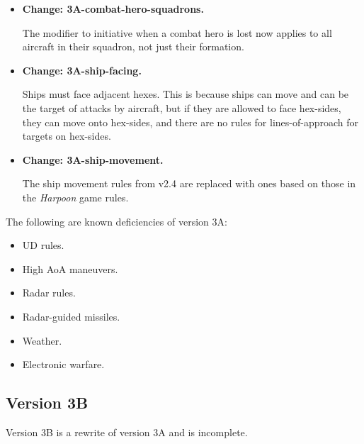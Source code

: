 \documentclass[10pt]{report}
\newcommand{\itemtag}[1]{\item \textbf{Change: #1.}\par}
\begin{document}
\begin{itemize}
    \itemtag{3A-combat-hero-squadrons} The  modifier to initiative when a combat hero is lost now applies to all aircraft in their squadron, not just their formation.
    
    \itemtag{3A-ship-facing} Ships must face adjacent hexes. This is because ships can move and can be the target of attacks by aircraft, but if they are allowed to face hex-sides, they can move onto hex-sides, and there are no rules for lines-of-approach for targets on hex-sides.
    
    \itemtag{3A-ship-movement} The ship movement rules from v2.4 are replaced with ones based on those in the \emph{Harpoon} game rules.


       
    
    

    
    
    

\end{itemize}

The following are known deficiencies of version 3A:
\begin{itemize}
\item UD rules.
\item High AoA maneuvers.
\item Radar rules.
\item Radar-guided missiles.
\item Weather.
\item Electronic warfare.
\end{itemize}


\subsection{Version 3B}

Version 3B is a rewrite of version 3A and is incomplete.
\end{document}
